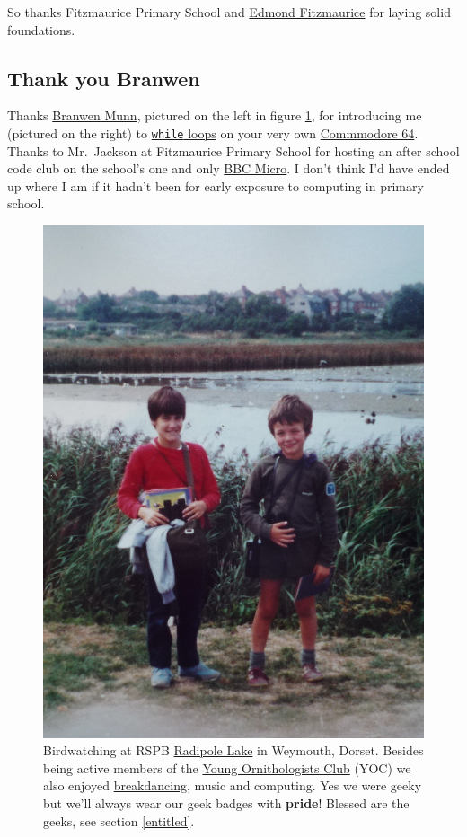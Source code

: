 \documentclass[
]{book}
\begin{document}
So thanks Fitzmaurice Primary School and \href{https://en.wikipedia.org/wiki/Edmond_Fitzmaurice,_1st_Baron_Fitzmaurice}{Edmond Fitzmaurice} for laying solid foundations. 🙏

\hypertarget{branwen}{%
\subsection{Thank you Branwen}\label{branwen}}

Thanks \href{https://www.branwen.online/}{Branwen Munn}, pictured on the left in figure \ref{fig:branwen-fig}, for introducing me (pictured on the right) to \href{https://en.wikipedia.org/wiki/While_loop}{\texttt{while} loops} on your very own \href{https://en.wikipedia.org/wiki/Commodore_64}{Commmodore 64}. Thanks to Mr.~Jackson at Fitzmaurice Primary School for hosting an after school code club on the school's one and only \href{https://en.wikipedia.org/wiki/BBC_Micro}{BBC Micro}. I don't think I'd have ended up where I am if it hadn't been for early exposure to computing in primary school.

\begin{figure}

{\centering \includegraphics[width=0.5\linewidth]{images/radipole-lake} 

}

\caption{Birdwatching at RSPB \href{https://en.wikipedia.org/wiki/Radipole_Lake}{Radipole Lake} in Weymouth, Dorset. Besides being active members of the \href{https://en.wikipedia.org/wiki/Young_Ornithologists\%27_Club}{Young Ornithologists Club} (YOC) we also enjoyed \href{https://en.wikipedia.org/wiki/Breakdancing}{breakdancing}, music and computing. Yes we were geeky but we'll always wear our geek badges with \textbf{pride}! Blessed are the geeks, see section \ref{entitled}.}\label{fig:branwen-fig}
\end{figure}
\end{document}
